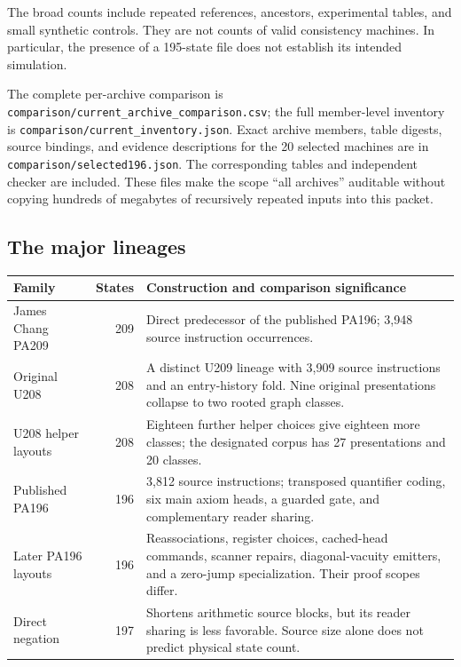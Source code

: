 \documentclass[11pt,letterpaper]{article}
\newcommand{\file}[1]{\texttt{\nolinkurl{#1}}}
\begin{document}
The broad counts include repeated references, ancestors, experimental
tables, and small synthetic controls. They are not counts of valid
consistency machines. In particular, the presence of a 195-state file
does not establish its intended simulation.

The complete per-archive comparison is
\file{comparison/current_archive_comparison.csv}; the full member-level
inventory is \file{comparison/current_inventory.json}. Exact archive
members, table digests, source bindings, and evidence descriptions for the
20 selected machines are in \file{comparison/selected196.json}.
The corresponding tables and independent checker are included.
These files make the scope ``all archives'' auditable without copying
hundreds of megabytes of recursively repeated inputs into this packet.

\subsection{The major lineages}

\begin{center}\small
\begin{tabular}{@{}p{1.30in}rp{4.45in}@{}}
\toprule
Family & States & Construction and comparison significance\\
\midrule
James Chang PA209 & 209 & Direct predecessor of the published PA196;
3,948 source instruction occurrences.\\
Original U208 & 208 & A distinct U209 lineage with 3,909 source
instructions and an entry-history fold. Nine original presentations
collapse to two rooted graph classes.\\
U208 helper layouts & 208 & Eighteen further helper choices give eighteen
more classes; the designated corpus has 27 presentations and 20 classes.\\
Published PA196 & 196 & 3,812 source instructions; transposed quantifier
coding, six main axiom heads, a guarded gate, and complementary reader
sharing.\\
Later PA196 layouts & 196 & Reassociations, register choices, cached-head
commands, scanner repairs, diagonal-vacuity emitters, and a zero-jump
specialization. Their proof scopes differ.\\
Direct negation & 197 & Shortens arithmetic source blocks, but its
reader sharing is less favorable. Source size alone does not predict
physical state count.\\
\bottomrule
\end{tabular}
\end{center}
\end{document}
